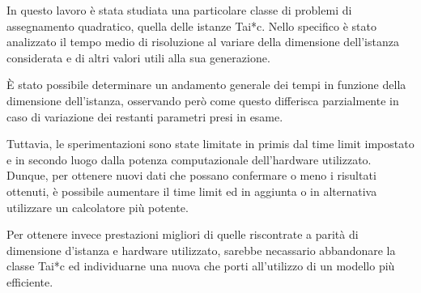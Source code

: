In questo lavoro è stata studiata una particolare classe di problemi di assegnamento quadratico, quella delle istanze Tai*c.
Nello specifico è stato analizzato il tempo medio di risoluzione al variare della dimensione dell'istanza considerata 
e di altri valori utili alla sua generazione.

È stato possibile determinare un andamento generale dei tempi in funzione della dimensione dell'istanza, osservando però come 
questo differisca parzialmente in caso di variazione dei restanti parametri presi in esame.

Tuttavia, le sperimentazioni sono state limitate in primis dal time limit impostato e in secondo luogo dalla potenza computazionale 
dell'hardware utilizzato. Dunque, per ottenere nuovi dati che possano confermare o meno i risultati ottenuti, è possibile aumentare il time limit ed in aggiunta o in alternativa 
utilizzare un calcolatore più potente.

Per ottenere invece prestazioni migliori di quelle riscontrate a parità di dimensione d'istanza e hardware utilizzato, sarebbe 
necassario abbandonare la classe Tai*c ed individuarne una nuova che porti all'utilizzo di un modello più efficiente.